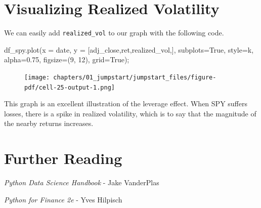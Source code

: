 \documentclass[
  letterpaper,
  DIV=11,
  numbers=noendperiod]{scrreprt}
\newenvironment{Shaded}{\begin{snugshade}}{\end{snugshade}}
\newcommand{\DecValTok}[1]{\textcolor[rgb]{0.68,0.00,0.00}{#1}}
\newcommand{\FloatTok}[1]{\textcolor[rgb]{0.68,0.00,0.00}{#1}}
\newcommand{\NormalTok}[1]{\textcolor[rgb]{0.00,0.23,0.31}{#1}}
\newcommand{\OperatorTok}[1]{\textcolor[rgb]{0.37,0.37,0.37}{#1}}
\newcommand{\StringTok}[1]{\textcolor[rgb]{0.13,0.47,0.30}{#1}}
\newcommand{\VariableTok}[1]{\textcolor[rgb]{0.07,0.07,0.07}{#1}}
\begin{document}
\hypertarget{visualizing-realized-volatility}{%
\section{Visualizing Realized
Volatility}\label{visualizing-realized-volatility}}

We can easily add \texttt{realized\_vol} to our graph with the following
code.

\begin{Shaded}
\begin{Highlighting}[]
\NormalTok{df\_spy.plot(x }\OperatorTok{=} \StringTok{\textquotesingle{}date\textquotesingle{}}\NormalTok{, }
\NormalTok{            y }\OperatorTok{=}\NormalTok{ [}\StringTok{\textquotesingle{}adj\_close\textquotesingle{}}\NormalTok{,}\StringTok{\textquotesingle{}ret\textquotesingle{}}\NormalTok{,}\StringTok{\textquotesingle{}realized\_vol\textquotesingle{}}\NormalTok{,], }
\NormalTok{            subplots}\OperatorTok{=}\VariableTok{True}\NormalTok{, style}\OperatorTok{=}\StringTok{\textquotesingle{}k\textquotesingle{}}\NormalTok{, alpha}\OperatorTok{=}\FloatTok{0.75}\NormalTok{, }
\NormalTok{            figsize}\OperatorTok{=}\NormalTok{(}\DecValTok{9}\NormalTok{, }\DecValTok{12}\NormalTok{), }
\NormalTok{            grid}\OperatorTok{=}\VariableTok{True}\NormalTok{)}\OperatorTok{;}
\end{Highlighting}
\end{Shaded}

\begin{figure}[H]

{\centering \texttt{[image: chapters/01\_jumpstart/jumpstart\_files/figure-pdf/cell-25-output-1.png]}

}

\end{figure}

This graph is an excellent illustration of the leverage effect. When SPY
suffers losses, there is a spike in realized volatility, which is to say
that the magnitude of the nearby returns increases.

\hypertarget{further-reading}{%
\section{Further Reading}\label{further-reading}}

\emph{Python Data Science Handbook} - Jake VanderPlas

\emph{Python for Finance 2e} - Yves Hilpisch
\end{document}
